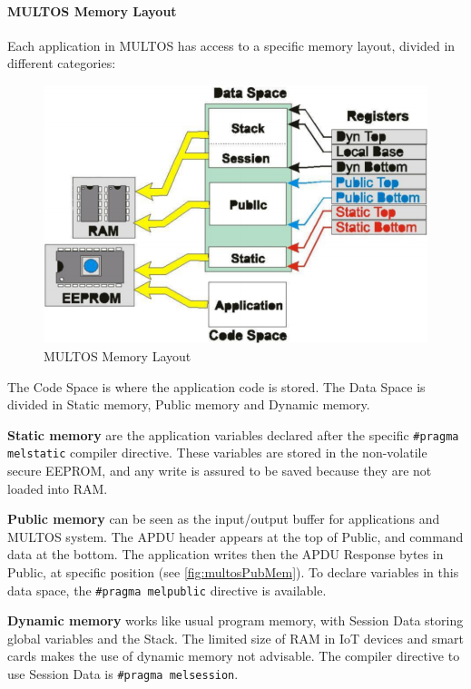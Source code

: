 \paragraph{MULTOS Memory Layout}

Each application in MULTOS has access to a specific memory layout, divided in different categories:

\begin{figure}[bth]
	\begin{center}
		\includegraphics[width=0.8\linewidth]{gfx/multosMemLay}
	\end{center}
	\caption{MULTOS Memory Layout}
	\label{fig:multosMemLay}
\end{figure}


The Code Space is where the application code is stored.
The Data Space is divided in Static memory, Public memory and Dynamic memory.

\textbf{Static memory} are the application variables declared after the specific \texttt{\#pragma melstatic} compiler directive. These variables are stored in the non-volatile secure EEPROM, and any write is assured to be saved because they are not loaded into RAM.

\textbf{Public memory} can be seen as the input/output buffer for applications and MULTOS system. The APDU header appears at the top of Public, and command data at the bottom. The application writes then the APDU Response bytes in Public, at specific position (see \autoref{fig:multosPubMem}). To declare variables in this data space, the \texttt{\#pragma melpublic} directive is available.

\textbf{Dynamic memory} works like usual program memory, with Session Data storing global variables and the Stack. The limited size of RAM in IoT devices and smart cards makes the use of dynamic memory not advisable. The compiler directive to use Session Data is \texttt{\#pragma melsession}.


